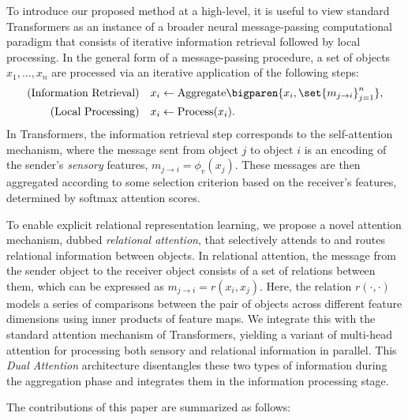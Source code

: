 To introduce our proposed method at a high-level, it is useful to view standard Transformers as an instance of a broader neural message-passing computational paradigm that consists of iterative information retrieval followed by local processing. In the general form of a message-passing procedure, a set of objects $x_1,\ldots, x_n$ are processed via an iterative application of the following steps:
\begin{equation}\label{eq:intro_message_passing}
  \begin{split}
    \text{(Information Retrieval)} \quad x_i &\gets \mathrm{Aggregate}\bigparen{x_i, \set{m_{j \to i}}_{j=1}^{n}}, \\
    \text{(Local Processing)} \quad x_i &\gets \mathrm{Process}(x_i).
  \end{split}
\end{equation}
In Transformers, the information retrieval step corresponds to the self-attention mechanism, where the message sent from object $j$ to object $i$ is an encoding of the sender's \textit{sensory} features, $m_{j \to i} = \phi_v(x_j)$. These messages are then aggregated according to some selection criterion based on the receiver's features, determined by softmax attention scores.

To enable explicit relational representation learning, we propose a novel attention mechanism, dubbed \textit{relational attention}, that selectively attends to and routes relational information between objects. In relational attention, the message from the sender object to the receiver object consists of a set of relations between them, which can be expressed as $m_{j \to i} = r(x_i, x_j)$. Here, the relation $r(\cdot, \cdot)$ models a series of comparisons between the pair of objects across different feature dimensions using inner products of feature maps. We integrate this with the standard attention mechanism of Transformers, yielding a variant of multi-head attention for processing both sensory and relational information in parallel. This \textit{Dual Attention} architecture disentangles these two types of information during the aggregation phase and integrates them in the information processing stage.

The contributions of this paper are summarized as follows:


